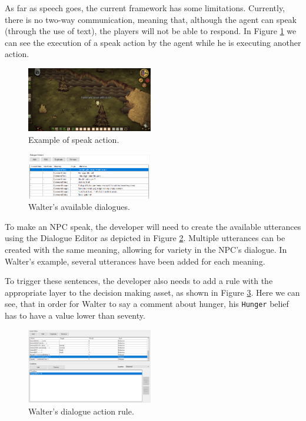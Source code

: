 As far as speech goes, the current framework has some limitations.
Currently, there is no two-way communication, meaning that, although the agent can speak (through the use of text), the players will not be able to respond.
In Figure \ref{fig:axe-dialogue} we can see the execution of a speak action by the agent while he is executing another action.

\begin{figure}
  \centering
  \includegraphics[width=0.49\textwidth]{./Images/axe-dialogue}
  \caption{Example of speak action.}
  \label{fig:axe-dialogue}
\end{figure}

\begin{figure}
  \centering
  \includegraphics[width=0.49\textwidth]{./Images/dialogue-example}
  \caption{Walter's available dialogues.}
  \label{fig:dialogue-example}
\end{figure}

To make an NPC speak, the developer will need to create the available utterances using the Dialogue Editor as depicted in Figure \ref{fig:dialogue-example}.
Multiple utterances can be created with the same meaning, allowing for variety in the NPC's dialogue.
In Walter's example, several utterances have been added for each meaning.

To trigger these sentences, the developer also needs to add a rule with the appropriate layer to the decision making asset, as shown in Figure \ref{fig:dialogue-action-example}.
Here we can see, that in order for Walter to say a comment about hunger, his \texttt{Hunger} belief has to have a value lower than seventy.

\begin{figure}
  \centering
  \includegraphics[width=0.49\textwidth]{./Images/dialogue-action-example}
  \caption{Walter's dialogue action rule.}
  \label{fig:dialogue-action-example}
\end{figure}

